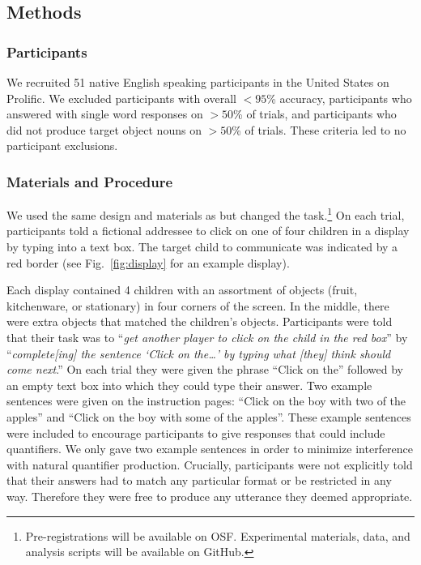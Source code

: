 \documentclass[10pt,letterpaper]{article}
\newcommand{\figref}[1]{Fig.~\ref{#1}}
\begin{document}

\subsection{Methods}
\subsubsection{Participants}
We recruited 51 native English speaking participants in the United States on Prolific. We excluded participants with overall $<95$\% accuracy, participants who answered with single word responses on $>50$\% of trials, and participants who did not produce target object nouns on $>50$\% of trials. These criteria led to no participant exclusions. %

\subsubsection{Materials and Procedure}
 We used the same design and materials as  but changed the task.\footnote{Pre-registrations will be available on OSF. Experimental materials, data, and analysis scripts will be available on GitHub.} On each trial, participants told a fictional addressee to click on one of four children in a display by typing into a text box. The target child to communicate was indicated by a red border (see \figref{fig:display} for an example display).   


Each display contained 4 children with an assortment of objects (fruit, kitchenware, or stationary) in four corners of the screen. In the middle, there were extra objects that matched the children's objects. Participants were told that their task was to ``\emph{get another player to click on the child in the red box}'' by ``\emph{complete[ing] the sentence `Click on the\dots' by typing what [they] think should come next}.'' On each trial they were given the phrase ``Click on the'' followed by an empty text box into which they could type their answer. Two example sentences were given on the instruction pages: ``Click on the boy with two of the apples'' and ``Click on the boy with some of the apples''. These example sentences were included to encourage participants to give responses that could include quantifiers. We only gave two example sentences in order to minimize interference with natural quantifier production. Crucially, participants were not explicitly told that their answers had to match any particular format or be restricted in any way. Therefore they were free to produce any utterance they deemed appropriate. 
\end{document}
